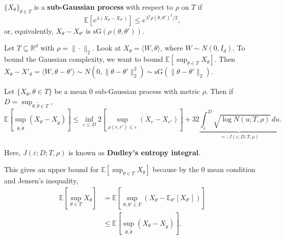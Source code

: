 \begin{defn}
$\{X_\theta\}_{\theta \in T}$ is a \textbf{sub-Gaussian process} with respect to $\rho$ on $T$ if
\[
\mathbb{E}[e^{\lambda(X_\theta - X_{\theta'})}] \leq e^{\lambda^2 \rho(\theta, \theta')^2 / 2},
\]
or, equivalently, $X_\theta - X_{\theta'}$ is $\mathrm{sG}(\rho(\theta, \theta'))$.
\end{defn}

\begin{exam}
Let $T \subseteq \mathbb{R}^d$ with $\rho = \|\cdot\|_2$. Look at $X_\theta = \langle W, \theta \rangle$, where $W \sim N(0, I_d)$. To bound the Gaussian complexity, we want to bound $\mathbb{E}[\sup_{\theta \in T} X_\theta]$. Then $X_\theta - X'_\theta = \langle W, \theta - \theta' \rangle \sim N(0, \|\theta - \theta'\|_2^2) \sim \mathrm{sG}(\|\theta - \theta'\|_2)$.
\end{exam}

\begin{prop}
Let $\{X_\theta, \theta \in T\}$ be a mean 0 sub-Gaussian process with metric $\rho$. Then if $D = \sup_{\theta, \widetilde{\theta} \in T}$,
\[
\mathbb{E}\left[\sup_{\theta, \widetilde{\theta}} (X_\theta - X_{\widetilde{\theta}})\right] \leq \inf_{\varepsilon \leq D} 2 \left[ \sup_{\rho(r, r') \leq \varepsilon} (X_r - X_{r'}) \right] + 32 \underbrace{\int_{\varepsilon}^{D} \sqrt{\log N(u; T, \rho)} \, du}_{=: J(\varepsilon; D; T, \rho)}.
\]
\end{prop}

Here, $J(\varepsilon; D; T, \rho)$ is known as \textbf{Dudley's entropy integral}.

\begin{rem}
This gives an upper bound for $\mathbb{E}[\sup_{\theta \in T} X_\theta]$ because by the 0 mean condition and Jensen's inequality,
\begin{align*}
\mathbb{E}\left[\sup_{\theta \in T} X_\theta\right] &= \mathbb{E}\left[\sup_{\theta, \theta' \in T} (X_\theta - \mathbb{E}_{\theta'}[X_{\theta'}])\right] \\
&\leq \mathbb{E}\left[\sup_{\theta, \widetilde{\theta}} (X_\theta - X_{\widetilde{\theta}})\right].
\end{align*}
\end{rem}


